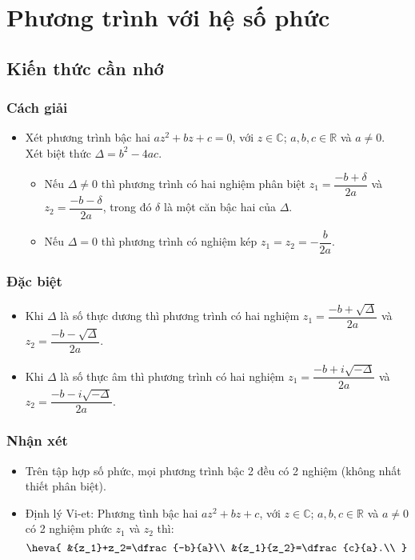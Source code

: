 \setcounter{ex}{0}
\section{Phương trình với hệ số phức}
\subsection{Kiến thức cần nhớ}
\begin{khung}
	\subsubsection{Cách giải}
	\begin{itemize}
		\item Xét phương trình bậc hai $az^2+bz+c=0$, với $z\in\mathbb{C}$; $a,b,c\in\mathbb{R}$ và $a\ne 0$.\\
		Xét biệt thức $\Delta=b^2-4ac$.
		\begin{itemize}
		\item Nếu $\Delta\ne 0$ thì phương trình có hai nghiệm phân biệt $z_1=\dfrac{-b+\delta}{2a}$ và $z_2=\dfrac{-b-\delta}{2a}$, trong đó $\delta $ là một căn bậc hai của $\Delta $.
		\item Nếu $\Delta=0$ thì phương trình có nghiệm kép $z_1=z_2=-\dfrac{b}{2a}$.
		\end{itemize}
	\end{itemize}
	\subsubsection{Đặc biệt}
	\begin{itemize}
		\item Khi $\Delta $ là số thực dương thì phương trình có hai nghiệm $z_1=\dfrac{-b+\sqrt{\Delta}}{2a}$ và $z_2=\dfrac{-b-\sqrt{\Delta}}{2a}$.
		\item Khi $\Delta $ là số thực âm thì phương trình có hai nghiệm $z_1=\dfrac{-b+i\sqrt{-\Delta}}{2a}$ và $z_2=\dfrac{-b-i\sqrt{-\Delta}}{2a}$.\\
	\end{itemize}
	\subsubsection{Nhận xét}
	\begin{itemize}
		\item Trên tập hợp số phức, mọi phương trình bậc 2 đều có 2 nghiệm (không nhất thiết phân biệt).
		\item Định lý Vi-et: Phương tình bậc hai $a{z^2}+bz+c$, với $z\in\mathbb{C}$; $a,b,c\in\mathbb{R}$ và $a\ne 0$ có 2 nghiệm phức $z_1$ và $z_2$ thì: 
		$$\heva{
			&{z_1}+z_2=\dfrac{-b}{a}\\ 
			&{z_1}{z_2}=\dfrac{c}{a}.\\ 
		}$$
	\end{itemize}
\end{khung}

